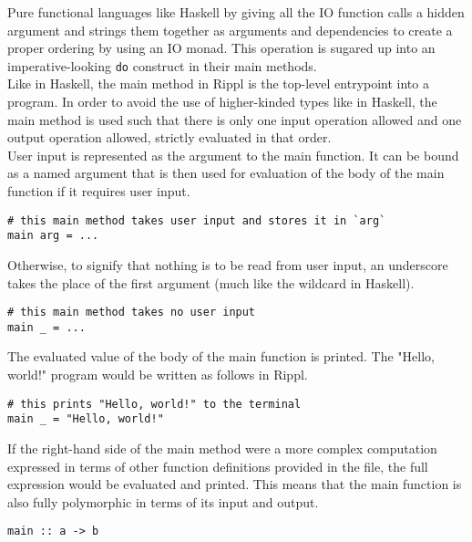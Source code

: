 ﻿\documentclass[5pt]{article}
\begin{document}
Pure functional languages like Haskell by giving all the IO function calls a hidden argument and strings them together as arguments and dependencies to create a proper ordering by using an IO monad. This operation is sugared up into an imperative-looking \texttt{do} construct in their main methods. \\

Like in Haskell, the main method in Rippl is the top-level entrypoint into a program. In order to avoid the use of higher-kinded types like in Haskell, the main method is used such that there is only one input operation allowed and one output operation allowed, strictly evaluated in that order.  \\

User input is represented as the argument to the main function. It can be bound as a named argument that is then used for evaluation of the body of the main function if it requires user input. \\

\begin{lstlisting}[language=rippl]
# this main method takes user input and stores it in `arg`
main arg = ... 
\end{lstlisting}

Otherwise, to signify that nothing is to be read from user input, an underscore takes the place of the first argument (much like the wildcard in Haskell). \\

\begin{lstlisting}[language=rippl]
# this main method takes no user input
main _ = ...    
\end{lstlisting}

The evaluated value of the body of the main function is printed. The "Hello, world!" program would be written as follows in Rippl.

\begin{lstlisting}[language=rippl]
# this prints "Hello, world!" to the terminal
main _ = "Hello, world!"
\end{lstlisting}

If the right-hand side of the main method were a more complex computation expressed in terms of other function definitions provided in the file, the full expression would be evaluated and printed. This means that the main function is also fully polymorphic in terms of its input and output. \\

\begin{lstlisting}[language=rippl]
main :: a -> b
\end{lstlisting}
\end{document}

